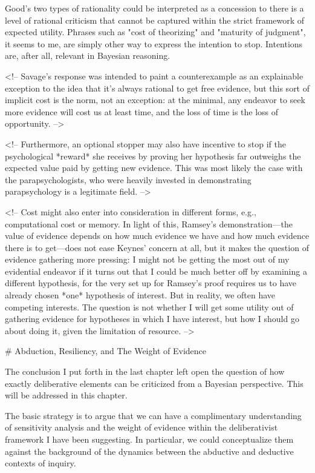 Good's two types of rationality could be interpreted as a concession to
there is a level of rational criticism that cannot be captured within
the strict framework of expected utility. Phrases such as "cost of
theorizing" and "maturity of judgment", it seems to me, are simply other
way to express the intention to stop. Intentions are, after all,
relevant in Bayesian reasoning.

\textless{}!-- Savage's response was intended to paint a counterexample
as an explainable exception to the idea that it's always rational to get
free evidence, but this sort of implicit cost is the norm, not an
exception: at the minimal, any endeavor to seek more evidence will cost
us at least time, and the loss of time is the loss of opportunity.
--\textgreater{}

\textless{}!-- Furthermore, an optional stopper may also have incentive
to stop if the psychological *reward* she receives by proving her
hypothesis far outweighs the expected value paid by getting new
evidence. This was most likely the case with the parapsychologists, who
were heavily invested in demonstrating parapsychology is a legitimate
field. --\textgreater{}

\textless{}!-- Cost might also enter into consideration in different
forms, e.g., computational cost or memory. In light of this, Ramsey's
demonstration---the value of evidence depends on how much evidence we
have and how much evidence there is to get---does not ease Keynes'
concern at all, but it makes the question of evidence gathering more
pressing: I might not be getting the most out of my evidential endeavor
if it turns out that I could be much better off by examining a different
hypothesis, for the very set up for Ramsey's proof requires us to have
already chosen *one* hypothesis of interest. But in reality, we often
have competing interests. The question is not whether I will get some
utility out of gathering evidence for hypotheses in which I have
interest, but how I should go about doing it, given the limitation of
resource. --\textgreater{}

\# Abduction, Resiliency, and The Weight of Evidence

The conclusion I put forth in the last chapter left open the question of
how exactly deliberative elements can be criticized from a Bayesian
perspective. This will be addressed in this chapter.

The basic strategy is to argue that we can have a complimentary
understanding of sensitivity analysis and the weight of evidence within
the deliberativist framework I have been suggesting. In particular, we
could conceptualize them against the background of the dynamics between
the abductive and deductive contexts of inquiry.

